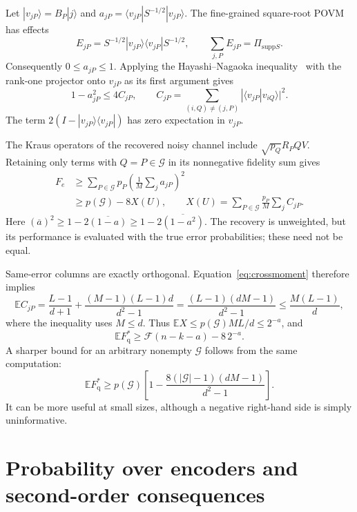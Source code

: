 \documentclass[aps,prl,onecolumn,superscriptaddress,amsmath,amssymb]{revtex4-2}
\newcommand{\E}{\mathbb E}
\newcommand{\Fq}{F_{\mathrm q}^{*}}
\newcommand{\Fs}{\mathcal F}
\begin{document}
Let $|v_{jP}\rangle=B_P|j\rangle$ and $a_{jP}=\langle v_{jP}|S^{-1/2}|v_{jP}\rangle$. The fine-grained square-root POVM has effects
\begin{equation}
E_{jP}=S^{-1/2}|v_{jP}\rangle\langle v_{jP}|S^{-1/2},\qquad
\sum_{j,P}E_{jP}=\Pi_{\mathrm{supp}S}.
\end{equation}
Consequently $0\le a_{jP}\le1$. Applying the Hayashi--Nagaoka inequality~\cite{HayashiNagaoka} with the rank-one projector onto $v_{jP}$ as its first argument gives
\begin{equation}
1-a_{jP}^2\le4C_{jP},\qquad
C_{jP}=\sum_{(i,Q)\ne(j,P)}|\langle v_{jP}|v_{iQ}\rangle|^2.
\label{eq:HN}
\end{equation}
The term $2(I-|v_{jP}\rangle\langle v_{jP}|)$ has zero expectation in $v_{jP}$.

The Kraus operators of the recovered noisy channel include $\sqrt{p_Q}R_PQV$. Retaining only terms with $Q=P\in\mathcal G$ in its nonnegative fidelity sum gives
\begin{align}
F_e&\ge\sum_{P\in\mathcal G}p_P\left(\frac1M\sum_ja_{jP}\right)^2\\
&\ge p(\mathcal G)-8X(U),\qquad
X(U)=\sum_{P\in\mathcal G}\frac{p_P}{M}\sum_j C_{jP}.
\label{eq:pointlower}
\end{align}
Here $(\overline a)^2\ge1-2\overline{(1-a)}\ge1-2\overline{(1-a^2)}$. The recovery is unweighted, but its performance is evaluated with the true error probabilities; these need not be equal.

Same-error columns are exactly orthogonal. Equation~\eqref{eq:crossmoment} therefore implies
\begin{equation}
\E C_{jP}=\frac{L-1}{d+1}+\frac{(M-1)(L-1)d}{d^2-1}
=\frac{(L-1)(dM-1)}{d^2-1}\le\frac{M(L-1)}d,
\end{equation}
where the inequality uses $M\le d$. Thus $\E X\le p(\mathcal G)ML/d\le2^{-a}$, and
\begin{equation}
\E\Fq\ge\Fs(n-k-a)-8\,2^{-a}.
\label{eq:lower}
\end{equation}
A sharper bound for an arbitrary nonempty $\mathcal G$ follows from the same computation:
\begin{equation}
\E\Fq\ge p(\mathcal G)
\left[1-\frac{8(|\mathcal G|-1)(dM-1)}{d^2-1}\right].
\label{eq:sharplower}
\end{equation}
It can be more useful at small sizes, although a negative right-hand side is simply uninformative.

\section{Probability over encoders and second-order consequences}
\end{document}
